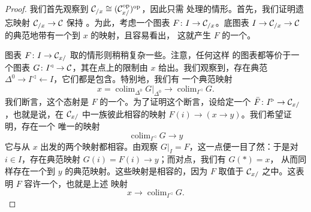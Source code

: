 \begin{proof}
我们首先观察到 $\mathcal{C}_{/x} \cong (\mathcal{C}^{\mathrm{op}}_{x/})^{\mathrm{op}}$，因此只需
处理\trColimit{}的情形。首先，我们证明遗忘映射 $\mathcal{C}_{/x} \to \mathcal{C}$ 保持%
\trColimit{}。为此，考虑一个图表 $F\colon I \to \mathcal{C}_{/x}$。底图表
$I \to \mathcal{C}_{/x} \to \mathcal{C}$ 的\trColimit{}典范地带有一个到 $x$ 的映射，且容易看出，
这就产生 $F$ 的一个\trColimit{}。

图表 $F\colon I \to \mathcal{C}_{x/}$ 取\trColimit{}的情形则稍稍复杂一些。注意，任何这样
的图表都等价于一个图表 $G\colon I^{\triangleleft} \to \mathcal{C}$，其在\trCone{}点上的限制由%
\trObject{} $x$ 给出。我们观察到，存在典范\trFunctor{}%
$\Delta^0 \to I^{\triangleleft} \leftarrow I$，它们都是包含。特别地，我们有
一个典范映射
\[
x = \operatorname{colim}_{\Delta^0} G|_{\Delta^0} \to
\operatorname{colim}_{I^{\triangleleft}} G.
\]
我们断言，这个态射是 $F$ 的一个\trColimit{}。为了证明这个断言，设给定一个%
\trFunctor{} $\bar{F}\colon I^{\triangleright} \to \mathcal{C}_{x/}$，也就是说，在
$\mathcal{C}_{x/}$ 中一族彼此相容的映射 $F(i) \to (x \to y)$。我们希望证明，存在一个
唯一的映射
\[
\operatorname{colim}_{I^{\triangleleft}} G \to y
\]
它与从 $x$ 出发的两个映射都相容。由观察 $G|_I = F$，这一点便一目了然：于是对
$i \in I$，存在典范映射 $G(i) = F(i) \to y$；而对\trCone{}点，我们有 $G(\ast) = x$，
从而同样存在一个到 $y$ 的典范映射。这些映射是相容的，因为 $F$ 取值于%
\trSliceCategory{} $\mathcal{C}_{x/}$ 之中。这表明 $F$ 容许一个\trColimit{}，也就是上述
映射
\[
x \to \operatorname{colim}_{I^{\triangleleft}} G.
\]


\end{proof}
